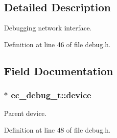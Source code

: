 \subsection{\-Detailed \-Description}
\-Debugging network interface. 

\-Definition at line 46 of file debug.\-h.



\subsection{\-Field \-Documentation}
\subsubsection[{device}]{$\ast$ {\bf ec\-\_\-debug\-\_\-t\-::device}}\label{structec__debug__t_ab18ba1d3de75e73ab1d89315240b615d}


\-Parent device. 



\-Definition at line 48 of file debug.\-h.

